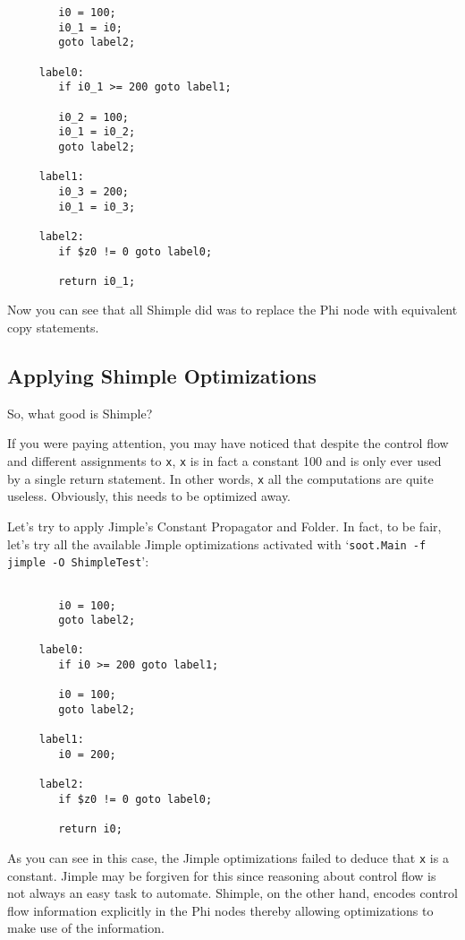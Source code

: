 \documentclass[10pt,letterpaper,oneside,onecolumn]{article}
\begin{document}
\begin{verbatim}
        i0 = 100;
        i0_1 = i0;
        goto label2;

     label0:
        if i0_1 >= 200 goto label1;

        i0_2 = 100;
        i0_1 = i0_2;
        goto label2;

     label1:
        i0_3 = 200;
        i0_1 = i0_3;

     label2:
        if $z0 != 0 goto label0;

        return i0_1;
\end{verbatim}

Now you can see that all Shimple did was to replace the Phi node
with equivalent copy statements.

\subsection{Applying Shimple Optimizations}

So, what good is Shimple?  

If you were paying attention, you may have noticed that despite the
control flow and different assignments to {\tt x}, {\tt x} is in fact
a constant 100 and is only ever used by a single return statement.  In
other words, {\tt x} all the computations are quite useless.  Obviously, 
this needs to be optimized away.

Let's try to apply Jimple's Constant Propagator and Folder.  In fact,
to be fair, let's try all the available  Jimple optimizations activated
with `{\tt soot.Main -f jimple -O ShimpleTest}':

\begin{verbatim}

        i0 = 100;
        goto label2;

     label0:
        if i0 >= 200 goto label1;

        i0 = 100;
        goto label2;

     label1:
        i0 = 200;

     label2:
        if $z0 != 0 goto label0;

        return i0;
\end{verbatim}

As you can see in this case, the Jimple optimizations failed to deduce
that {\tt x} is a constant.  Jimple may be forgiven for this since
reasoning about control flow is not always an easy task to automate.
Shimple, on the other hand, encodes control flow information
explicitly in the Phi nodes thereby allowing optimizations to make use
of the information.
\end{document}
